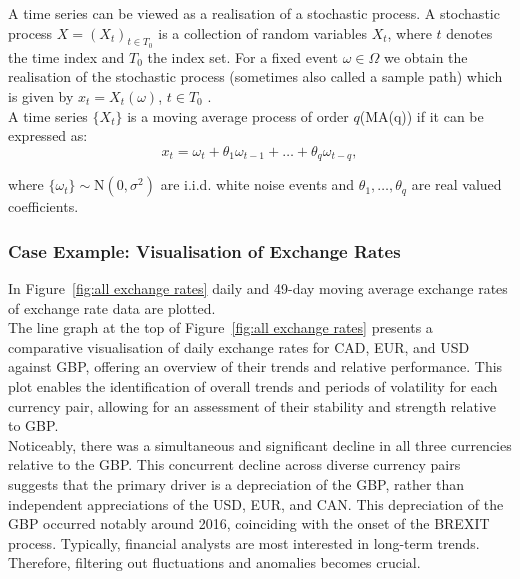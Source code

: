 \documentclass{article}\usepackage[]{graphicx}\usepackage[]{xcolor}
\numberwithin{equation}{section}
\begin{document}
\noindent
A time series can be viewed as a realisation of a stochastic process. A stochastic process $X = (X_t)_{t \in T_0}$ is a collection of random variables $X_t$, where $t$ denotes the time index and $T_0$ the index set. For a fixed event $\omega \in \Omega$ we obtain the realisation of the stochastic process (sometimes also called a sample path) which is given by $x_t = X_t(\omega)$, $t \in T_0$ \cite{Brockwell2016Introduction}.\\

\noindent
A time series $\{X_t\}$ is a moving average process \cite{Brockwell2016Introduction} of order $q$(MA(q)) if it can be expressed as:
\[x_t = \omega_t + \theta_1 \omega_{t-1}+\dots+ \theta_q \omega_{t-q},\]

\noindent
where $\{\omega_t\} \sim \text{N}(0, \sigma^2)$ are i.i.d. white noise events and $\theta_1,\dots,\theta_q$ are real valued coefficients.

\subsubsection{Case Example: Visualisation of Exchange Rates}

In Figure~\ref{fig:all exchange rates} daily and 49-day moving average exchange rates of exchange rate data are plotted.\\

\noindent The line graph at the top of Figure~\ref{fig:all exchange rates} presents a comparative visualisation of daily exchange rates for CAD, EUR, and USD against GBP, offering an overview of their trends and relative performance. This plot enables the identification of overall trends and periods of volatility for each currency pair, allowing for an assessment of their stability and strength relative to GBP.\\

\noindent Noticeably, there was a simultaneous and significant decline in all three currencies relative to the GBP. This concurrent decline across diverse currency pairs suggests that the primary driver is a depreciation of the GBP, rather than independent appreciations of the USD, EUR, and CAN. This depreciation of the GBP occurred notably around 2016, coinciding with the onset of the BREXIT process. Typically, financial analysts are most interested in long-term trends. Therefore, filtering out fluctuations and anomalies becomes crucial.\\
\end{document}
